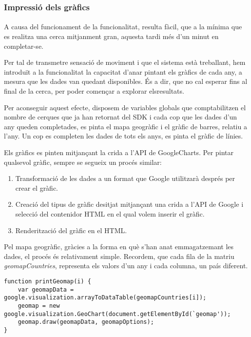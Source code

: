 \subsubsection{Impressió dels gràfics}

\paragraph{}
A causa del funcionament de la funcionalitat, resulta fàcil, que a la mínima que es realitza una cerca mitjanment gran, aquesta tardi més d'un minut en completar-se.

Per tal de transmetre sensació de moviment i que el sistema està treballant, hem introduït a la funcionalitat la capacitat d'anar pintant els gràfics de cada any, a mesura que les dades van quedant disponibles. És a dir, que no cal esperar fins al final de la cerca, per poder començar a explorar elsresultats.

Per aconseguir aquest efecte, disposem de variables globals que comptabilitzen el nombre de cerques que ja han retornat del SDK i cada cop que les dades d'un any queden completades, es pinta el mapa geogràfic i el gràfic de barres, relatiu a l'any. Un cop es completen les dades de tots els anys, es pinta el gràfic de línies.

Els gràfics es pinten mitjançant la crida a l'API de GoogleCharts. Per pintar qualsevol gràfic, sempre se segueix un procés similar:

\begin{enumerate}
    \item Transformació de les dades a un format que Google utilitzarà després per crear el gràfic.
    \item Creació del tipus de gràfic desitjat mitjançant una crida a l'API de Google i selecció del contenidor HTML en el qual volem inserir el gràfic.
    \item Renderització del gràfic en el HTML.
\end{enumerate}

Pel mapa geogràfic, gràcies a la forma en què s’han anat emmagatzemant les dades, el procés és relativament simple. Recordem, que cada fila de la matriu \emph{geomap\-Countries}, representa els valors d’un any i cada columna, un país diferent.

\begin{lstlisting}[style=rawOwn,caption={Creació del mapa geogràfic}]
function printGeomap(i) {
    var geomapData = google.visualization.arrayToDataTable(geomapCountries[i]);
    geomap = new google.visualization.GeoChart(document.getElementById(`geomap'));
    geomap.draw(geomapData, geomapOptions);
}
\end{lstlisting}

